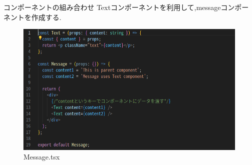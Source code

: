 \documentclass[aspectratio=169]{beamer}
\begin{document}
\begin{frame}{コンポーネントの組み合わせ}
    Textコンポーネントを利用して,messageコンポーネントを作成する.
    \begin{figure}
        \centering
       \includegraphics[scale=0.35]{Message_tsx.png}
       \caption{Message.tsx}
    \end{figure}
\end{frame}
\end{document}
